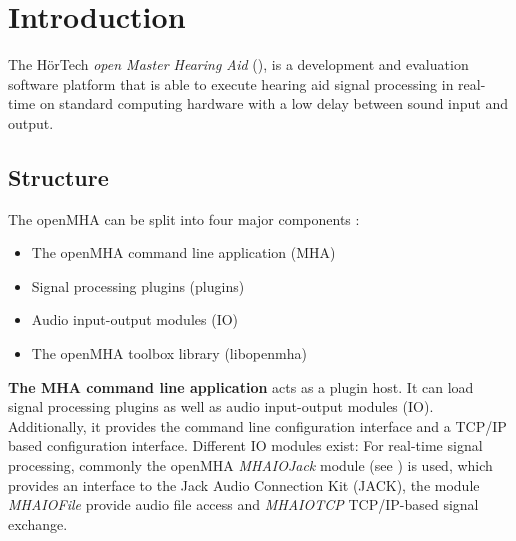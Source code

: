 
\section{Introduction}
The H\"{o}rTech \emph{open Master Hearing Aid} (\mha), is a development
and evaluation software platform that is able to execute hearing aid signal
processing in real-\/time on standard computing hardware with a low delay
between sound input and output.

\subsection{Structure}\label{index_str}
The openMHA can be split into four major components :
\begin{itemize}
\item The openMHA command line application (MHA)
\item Signal processing plugins (plugins)
\item Audio input-\/output modules (IO)
\item The openMHA toolbox library (libopenmha)
\end{itemize} 

{\bf The MHA command line application} acts as a plugin host. It can load signal processing plugins as well as audio input-\/output modules (IO). Additionally, it provides the command line configuration interface and a TCP/IP based configuration interface. Different IO modules exist: For real-\/time signal processing, commonly the openMHA \emph{MHAIOJack} module (see \PluginManual) is used, which provides an interface to the Jack Audio Connection Kit (JACK), the module \emph{MHAIOFile} provide audio file access and \emph{MHAIOTCP} TCP/IP-\/based signal exchange.

